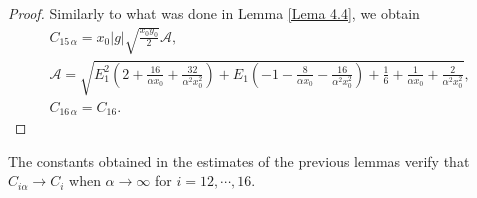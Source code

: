 \documentclass[axioms,article,submit,moreauthors]{Definitions/mdpi}
\begin{document}
   \begin{proof} Similarly to what was done in Lemma \ref{Lema 4.4}, we obtain
   \[\begin{array}{c}
   C_{15\, \alpha}=x_0  |g|  \sqrt{\tfrac{x_0 y_0}{2}} \mathcal{A}, \\[0.45cm]
  \mathcal{A}= \sqrt{E_1^2\left(2+\tfrac{16}{\alpha x_0}+\tfrac{32}{\alpha^2x_0^2} \right)+E_1\left(-1-\tfrac{8}{\alpha x_0}-\tfrac{16}{\alpha^2 x_0^2} \right)+\tfrac{1}{6}+\tfrac{1}{\alpha x_0}+\tfrac{2}{\alpha^2 x_0^2} },\\[0.45cm]
  C_{16\, \alpha}=C_{16}.
   \end{array}\]
   \end{proof}
\begin{Remark}
The constants obtained in the estimates of the previous lemmas verify that \mbox{$C_{i\alpha}\to C_i$}  when $ \alpha\to\infty$ for $i=12,\cdots,16$.
\end{Remark}
\end{document}
